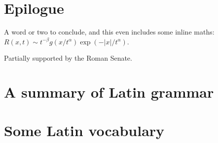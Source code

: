 \documentclass[twocolumn]{autart}    %
\begin{document}
\section{Epilogue}
A word or two to conclude, and this even includes some inline 
maths:  $R(x,t)\sim t^{-\beta}g(x/t^\alpha)\exp(-|x|/t^\alpha)$.

\begin{ack}                               %
Partially supported by the Roman Senate.  %
\end{ack}




\appendix
\section{A summary of Latin grammar}    %
\section{Some Latin vocabulary}         %
\end{document}
